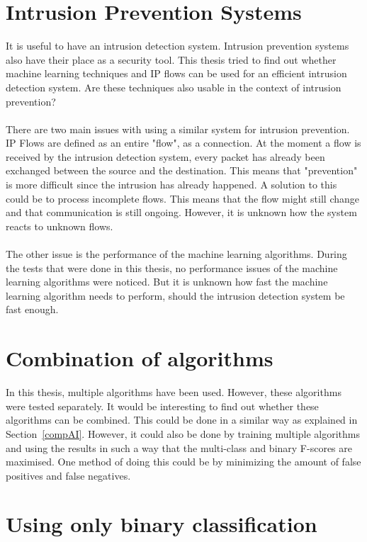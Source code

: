 \section{Intrusion Prevention Systems}
It is useful to have an intrusion detection system. Intrusion prevention systems also have their place as a security tool. This thesis tried to find out whether machine learning techniques and IP flows can be used for an efficient intrusion detection system. Are these techniques also usable in the context of intrusion prevention? \\
\\
There are two main issues with using a similar system for intrusion prevention. IP Flows are defined as an entire "flow", as a connection. At the moment a flow is received by the intrusion detection system, every packet has already been exchanged between the source and the destination. This means that "prevention" is more difficult since the intrusion has already happened. A solution to this could be to process incomplete flows. This means that the flow might still change and that communication is still ongoing. However, it is unknown how the system reacts to unknown flows. \\
\\
The other issue is the performance of the machine learning algorithms. During the tests that were done in this thesis, no performance issues of the machine learning algorithms were noticed. But it is unknown how fast the machine learning algorithm needs to perform, should the intrusion detection system be fast enough.

\section{Combination of algorithms}
In this thesis, multiple algorithms have been used. However, these algorithms were tested separately. It would be interesting to find out whether these algorithms can be combined. This could be done in a similar way as explained in Section~\ref{compAI}. However, it could also be done by training multiple algorithms and using the results in such a way that the multi-class and binary F-scores are maximised. One method of doing this could be by minimizing the amount of false positives and false negatives. 

\section{Using only binary classification}

